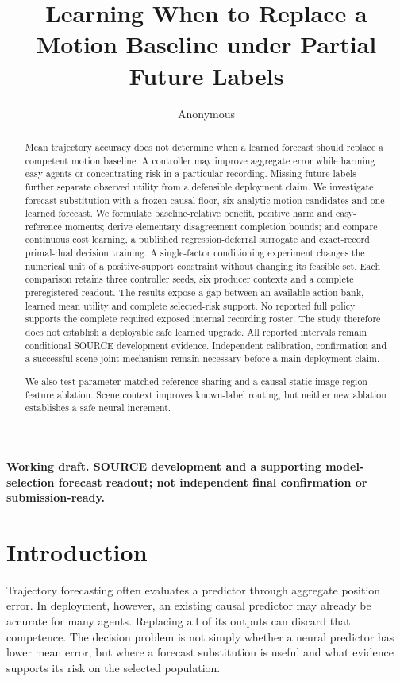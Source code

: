\documentclass[10pt,twocolumn,letterpaper]{article}
\title{Learning When to Replace a Motion Baseline under Partial Future Labels}
\author{Anonymous}
\begin{document}
\raggedbottom
\maketitle
\textbf{Working draft. SOURCE development and a supporting model-selection forecast readout; not independent final confirmation or submission-ready.}

\begin{abstract}
Mean trajectory accuracy does not determine when a learned forecast should
replace a competent motion baseline. A controller may improve aggregate error
while harming easy agents or concentrating risk in a particular recording.
Missing future labels further separate observed utility from a defensible
deployment claim. We investigate forecast substitution with a frozen causal
floor, six analytic motion candidates and one learned forecast. We formulate
baseline-relative benefit, positive harm and easy-reference moments; derive
elementary disagreement completion bounds; and compare continuous cost
learning, a published regression-deferral surrogate and exact-record
primal-dual decision training. A single-factor conditioning experiment changes
the numerical unit of a positive-support constraint without changing its
feasible set. Each comparison retains three controller seeds, six producer
contexts and a complete preregistered readout. The results expose a gap between
an available action bank, learned mean utility and complete selected-risk
support. No reported full policy supports the complete required exposed internal recording roster. The study therefore does not establish a deployable safe learned upgrade. All reported intervals remain conditional SOURCE
development evidence. Independent calibration, confirmation and a successful
scene-joint mechanism remain necessary before a main deployment claim.

We also test parameter-matched reference sharing and a causal static-image-region feature ablation. Scene context improves known-label routing, but neither new ablation establishes a safe neural increment.

\end{abstract}
\section{Introduction}
Trajectory forecasting often evaluates a predictor through aggregate position
error. In deployment, however, an existing causal predictor may already be
accurate for many agents. Replacing all of its outputs can discard that
competence. The decision problem is not simply whether a neural predictor has
lower mean error, but where a forecast substitution is useful and what evidence
supports its risk on the selected population.
\end{document}
